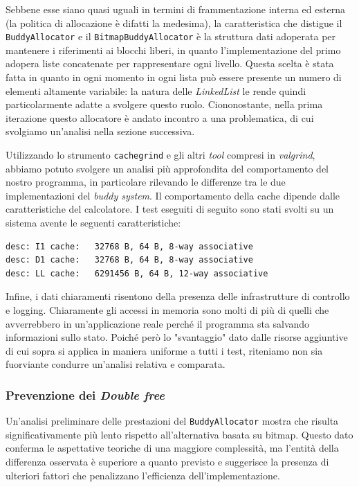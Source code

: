 Sebbene esse siano quasi uguali in termini di frammentazione interna ed esterna (la politica di allocazione è difatti la medesima), la caratteristica che distigue il \texttt{BuddyAllocator} e il \texttt{BitmapBuddyAllocator} è la struttura dati adoperata per mantenere i riferimenti ai blocchi liberi, in quanto l'implementazione del primo adopera liste concatenate per rappresentare ogni livello. Questa scelta è stata fatta in quanto in ogni momento in ogni lista può essere presente un numero di elementi altamente variabile: la natura delle \textit{LinkedList} le rende quindi particolarmente adatte a svolgere questo ruolo. Ciononostante, nella prima iterazione questo allocatore è andato incontro a una problematica, di cui svolgiamo un'analisi nella sezione successiva.

Utilizzando lo strumento \texttt{cachegrind} e gli altri \textit{tool} compresi in \textit{valgrind}, abbiamo potuto svolgere un analisi più approfondita del comportamento del nostro programma, in particolare rilevando le differenze tra le due implementazioni del \textit{buddy system}. Il comportamento della cache dipende dalle caratteristiche del calcolatore. I test eseguiti di seguito sono stati svolti su un sistema avente le seguenti caratteristiche:
\begin{lstlisting}[language={}]
desc: I1 cache:   32768 B, 64 B, 8-way associative
desc: D1 cache:   32768 B, 64 B, 8-way associative
desc: LL cache:   6291456 B, 64 B, 12-way associative
\end{lstlisting}

Infine, i dati chiaramenti risentono della presenza delle infrastrutture di controllo e logging. Chiaramente gli accessi in memoria sono molti di più di quelli che avverrebbero in un'applicazione reale perché il programma sta salvando informazioni sullo stato. Poiché però lo "svantaggio" dato dalle risorse aggiuntive di cui sopra si applica in maniera uniforme a tutti i test, riteniamo non sia fuorviante condurre un'analisi relativa e comparata.

\subsubsection*{Prevenzione dei \textit{Double free}}
Un'analisi preliminare delle prestazioni del \texttt{BuddyAllocator} mostra che risulta significativamente più lento rispetto all'alternativa basata su bitmap. Questo dato conferma le aspettative teoriche di una maggiore complessità, ma l'entità della differenza osservata è superiore a quanto previsto e suggerisce la presenza di ulteriori fattori che penalizzano l'efficienza dell'implementazione.

